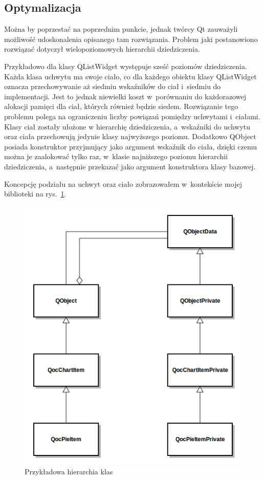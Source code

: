 \documentclass[11pt,twoside,a4paper,final]{llncs}
\begin{document}
\subsection{Optymalizacja}
Można by poprzestać na poprzednim punkcie, jednak twórcy Qt zauważyli możliwość udoskonalenia opisanego tam rozwiązania.
Problem jaki postanowiono rozwiązać dotyczył wielopoziomowych hierarchii dziedziczenia. 

Przykładowo dla klasy QListWidget występuje sześć poziomów dziedziczenia. Każda klasa uchwytu ma swoje ciało, co dla każdego obiektu klasy QListWidget oznacza przechowywanie aż siedmiu wskaźników do ciał i~siedmiu do implementacji. Jest to jednak niewielki koszt w~porównaniu do każdorazowej alokacji pamięci dla ciał, których również będzie siedem.
Rozwiązanie tego problemu polega na ograniczeniu liczby powiązań pomiędzy uchwytami i~ciałami. Klasy ciał zostały ułożone w hierarchię dziedziczenia, a~wskaźniki do uchwytu oraz ciała przechowują jedynie klasy najwyższego poziomu. Dodatkowo QObject posiada konstruktor przyjmujący jako argument wskaźnik do ciała, dzięki czemu można je zaalokować tylko raz, w~klasie najniższego poziomu hierarchii dziedziczenia, a~następnie przekazać jako argument konstruktora klasy bazowej. 


Koncepcję podziału na uchwyt oraz ciało zobrazowałem w~kontekście mojej biblioteki na rys.~\ref{rys:dpointer}.
\begin{figure}
\centering
\caption{Przykładowa hierarchia klas}\label{rys:dpointer}
\includegraphics[scale=0.6]{dpointer.png}
\end{figure}
\end{document}
